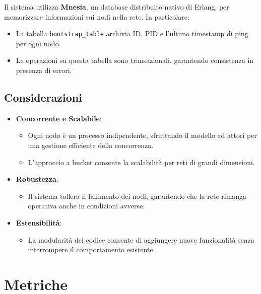 \documentclass{article}
\begin{document}
Il sistema utilizza \textbf{Mnesia}, un database distribuito nativo di Erlang, per memorizzare informazioni sui nodi nella rete. In particolare:
\begin{itemize}
    \item La tabella \texttt{bootstrap\_table} archivia ID, PID e l'ultimo timestamp di ping per ogni nodo.
    \item Le operazioni su questa tabella sono transazionali, garantendo consistenza in presenza di errori.
\end{itemize}

\subsection{Considerazioni}
\begin{itemize}
    \item \textbf{Concorrente e Scalabile}:
    \begin{itemize}
        \item Ogni nodo è un processo indipendente, sfruttando il modello ad attori per una gestione efficiente della concorrenza.
        \item L'approccio a bucket consente la scalabilità per reti di grandi dimensioni.
    \end{itemize}
    \item \textbf{Robustezza}:
    \begin{itemize}
        \item Il sistema tollera il fallimento dei nodi, garantendo che la rete rimanga operativa anche in condizioni avverse.
    \end{itemize}
    \item \textbf{Estensibilità}:
    \begin{itemize}
        \item La modularità del codice consente di aggiungere nuove funzionalità senza interrompere il comportamento esistente.
    \end{itemize}
\end{itemize}

\section{Metriche}

\printbibliography
\end{document}
